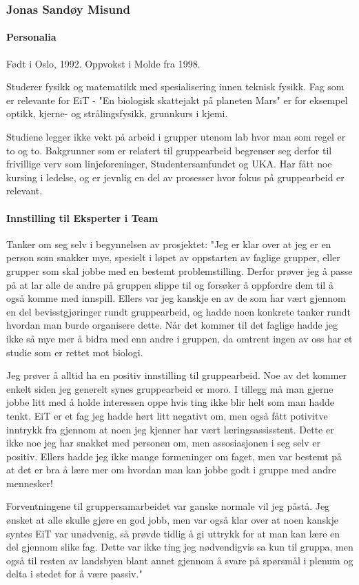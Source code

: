 \subsubsection{Jonas Sandøy Misund}

\paragraph{Personalia}
Født i Oslo, 1992.
Oppvokst i Molde fra 1998.

Studerer fysikk og matematikk med spesialisering innen teknisk fysikk.
Fag som er relevante for EiT - "En biologisk skattejakt på planeten Mars" er for eksempel optikk, kjerne- og strålingsfysikk, grunnkurs i kjemi.

Studiene legger ikke vekt på arbeid i grupper utenom lab hvor man som regel er to og to.
Bakgrunner som er relatert til gruppearbeid begrenser seg derfor til frivillige verv som linjeforeninger, Studentersamfundet og UKA.
Har fått noe kursing i ledelse, og er jevnlig en del av prosesser hvor fokus på gruppearbeid er relevant.

\paragraph{Innstilling til Eksperter i Team}
Tanker om seg selv i begynnelsen av prosjektet:
"Jeg er klar over at jeg er en person som snakker mye, spesielt i løpet av oppstarten av faglige grupper, eller grupper som skal jobbe med en bestemt problemstilling.
Derfor prøver jeg å passe på at lar alle de andre på gruppen slippe til og forsøker å oppfordre dem til å også komme med innspill.
Ellers var jeg kanskje en av de som har vært gjennom en del bevisstgjøringer rundt gruppearbeid, og hadde noen konkrete tanker rundt hvordan man burde organisere dette.
Når det kommer til det faglige hadde jeg ikke så mye mer å bidra med enn andre i gruppen, da omtrent ingen av oss har et studie som er rettet mot biologi.

Jeg prøver å alltid ha en positiv innstilling til gruppearbeid.
Noe av det kommer enkelt siden jeg generelt synes gruppearbeid er moro.
I tillegg må man gjerne jobbe litt med å holde interessen oppe hvis ting ikke blir helt som man hadde tenkt.
EiT er et fag jeg hadde hørt litt negativt om, men også fått potivitve inntrykk fra gjennom at noen jeg kjenner har vært læringsassisstent.
Dette er ikke noe jeg har snakket med personen om, men assosiasjonen i seg selv er positiv.
Ellers hadde jeg ikke mange formeninger om faget, men var bestemt på at det er bra å lære mer om hvordan man kan jobbe godt i gruppe med andre mennesker!

Forventningene til gruppersamarbeidet var ganske normale vil jeg påstå.
Jeg ønsket at alle skulle gjøre en god jobb, men var også klar over at noen kanskje syntes EiT var unødvenig, så prøvde tidlig å gi uttrykk for at man kan lære en del gjennom slike fag.
Dette var ikke ting jeg nødvendigvis sa kun til gruppa, men også til resten av landsbyen blant annet gjennom å svare på spørsmål i plenum og delta i stedet for å være passiv."